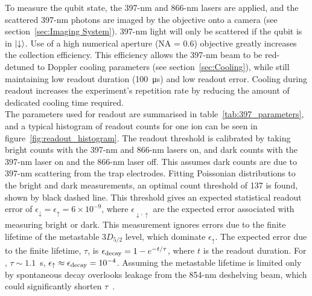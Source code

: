     To measure the qubit state, the 397-nm and 866-nm lasers
    are applied, and the scattered 397-nm photons are imaged by the objective onto a camera (see section~\ref{sec:Imaging System}). 397-nm light will only be scattered if the qubit is in $\ket{\downarrow}$.
    Use of a high numerical aperture (NA = 0.6) objective greatly increases the collection efficiency.
    This efficiency allows the 397-nm beam to be red-detuned to Doppler cooling parameters (see section~\ref{sec:Cooling}), while still maintaining low readout duration (100~\unit{\us}) and low readout error. 
    Cooling during readout increases the experiment's repetition rate by reducing the amount of dedicated cooling time required.\\
    The parameters used for readout are
    summarised in table~\ref{tab:397_parameters}, and a typical histogram of
    readout counts for one ion can be seen in
    figure~\ref{fig:readout_histogram}. The readout threshold is calibrated by taking bright counts with the 397-nm and 866-nm lasers on, and dark counts with the 397-nm laser on and the 866-nm laser off. This assumes dark counts are due to 397-nm scattering from the trap electrodes. 
    Fitting Poissonian distributions to the bright and dark measurements, an optimal count threshold of
    137 is found, shown by black dashed line. This threshold gives an expected
    statistical readout error of $\epsilon_\downarrow = \epsilon_\uparrow = 6\times10^{-9}$, where $\epsilon_{\downarrow,\uparrow}$ are the expected error associated with measuring bright or dark. This measurement ignores errors due to the
    finite lifetime of the metastable $3D_{5/2}$ level, which dominate $\epsilon_\uparrow$. The expected error due
    to the finite lifetime, $\tau$, is $\epsilon_{\rm decay} = 1 - e^{-t/\tau}$, where $t$ is the readout duration. For \ca, $\tau \sim 1.1$~s, $\epsilon_\uparrow \approx \epsilon_{\rm decay}  = 
    10^{-4}$. 
    Assuming the metastable lifetime is limited only by spontaneous decay overlooks leakage from the 854-nm deshelving beam, which could significantly shorten $\tau$~\cite{sotirova2024high-fidelity}. \\
    
